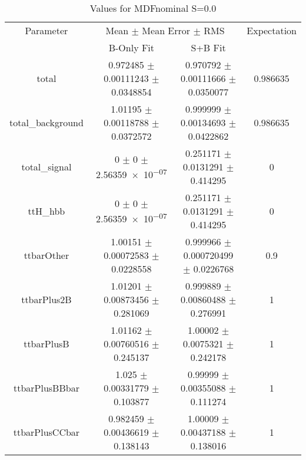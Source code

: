 \begin{table}
\centering
\caption{Values for MDFnominal S=0.0}
\begin{tabular}{cccc}
\toprule
Parameter & \multicolumn{2}{c}{Mean $\pm$ Mean Error $\pm$ RMS} & Expectation\\
 & B-Only Fit & S+B Fit & \\
\midrule
total & \num{0.972485} $\pm$ \num{0.00111243} $\pm$ \num{0.0348854} & \num{0.970792} $\pm$ \num{0.00111666} $\pm$ \num{0.0350077} & \num{0.986635}\\
total\_background & \num{1.01195} $\pm$ \num{0.00118788} $\pm$ \num{0.0372572} & \num{0.999999} $\pm$ \num{0.00134693} $\pm$ \num{0.0422862} & \num{0.986635}\\
total\_signal & \num{0} $\pm$ \num{0} $\pm$ \num{2.56359e-07} & \num{0.251171} $\pm$ \num{0.0131291} $\pm$ \num{0.414295} & \num{0}\\
ttH\_hbb & \num{0} $\pm$ \num{0} $\pm$ \num{2.56359e-07} & \num{0.251171} $\pm$ \num{0.0131291} $\pm$ \num{0.414295} & \num{0}\\
ttbarOther & \num{1.00151} $\pm$ \num{0.00072583} $\pm$ \num{0.0228558} & \num{0.999966} $\pm$ \num{0.000720499} $\pm$ \num{0.0226768} & \num{0.9}\\
ttbarPlus2B & \num{1.01201} $\pm$ \num{0.00873456} $\pm$ \num{0.281069} & \num{0.999889} $\pm$ \num{0.00860488} $\pm$ \num{0.276991} & \num{1}\\
ttbarPlusB & \num{1.01162} $\pm$ \num{0.00760516} $\pm$ \num{0.245137} & \num{1.00002} $\pm$ \num{0.0075321} $\pm$ \num{0.242178} & \num{1}\\
ttbarPlusBBbar & \num{1.025} $\pm$ \num{0.00331779} $\pm$ \num{0.103877} & \num{0.99999} $\pm$ \num{0.00355088} $\pm$ \num{0.111274} & \num{1}\\
ttbarPlusCCbar & \num{0.982459} $\pm$ \num{0.00436619} $\pm$ \num{0.138143} & \num{1.00009} $\pm$ \num{0.00437188} $\pm$ \num{0.138016} & \num{1}\\
\bottomrule
\end{tabular}
\end{table}